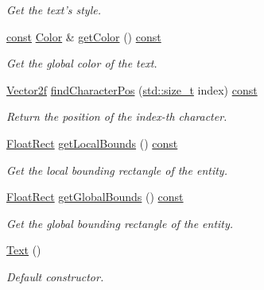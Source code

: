 \begin{DoxyCompactItemize}
\begin{DoxyCompactList}\small\item\em Get the text's style. \end{DoxyCompactList}\item 
\hyperlink{term__entry_8h_a57bd63ce7f9a353488880e3de6692d5a}{const} \hyperlink{classsf_1_1_color}{Color} \& \hyperlink{classsf_1_1_text_ae42818342a74a9d04644e2fbbd4ca29a}{get\-Color} () \hyperlink{term__entry_8h_a57bd63ce7f9a353488880e3de6692d5a}{const} 
\begin{DoxyCompactList}\small\item\em Get the global color of the text. \end{DoxyCompactList}\item 
\hyperlink{namespacesf_a80cea3c46537294fd1d8d428566ad8b2}{Vector2f} \hyperlink{classsf_1_1_text_adf120ed4159e43daa782b17fea23ea82}{find\-Character\-Pos} (\hyperlink{nc__alloc_8h_a7b60c5629e55e8ec87a4547dd4abced4}{std\-::size\-\_\-t} index) \hyperlink{term__entry_8h_a57bd63ce7f9a353488880e3de6692d5a}{const} 
\begin{DoxyCompactList}\small\item\em Return the position of the {\itshape index-\/th} character. \end{DoxyCompactList}\item 
\hyperlink{namespacesf_ab0d978f5903922a6bdfca1736b71ccc9}{Float\-Rect} \hyperlink{classsf_1_1_text_a8a766ea03a1b8899cd1542765771a4ae}{get\-Local\-Bounds} () \hyperlink{term__entry_8h_a57bd63ce7f9a353488880e3de6692d5a}{const} 
\begin{DoxyCompactList}\small\item\em Get the local bounding rectangle of the entity. \end{DoxyCompactList}\item 
\hyperlink{namespacesf_ab0d978f5903922a6bdfca1736b71ccc9}{Float\-Rect} \hyperlink{classsf_1_1_text_a95d732f58bd12bf7ec388b106f3729ba}{get\-Global\-Bounds} () \hyperlink{term__entry_8h_a57bd63ce7f9a353488880e3de6692d5a}{const} 
\begin{DoxyCompactList}\small\item\em Get the global bounding rectangle of the entity. \end{DoxyCompactList}\item 
\hyperlink{classsf_1_1_text_aff7cab6a92e5948c9d1481cb2d87eb84}{Text} ()
\begin{DoxyCompactList}\small\item\em Default constructor. \end{DoxyCompactList}\item 

\end{DoxyCompactItemize}
